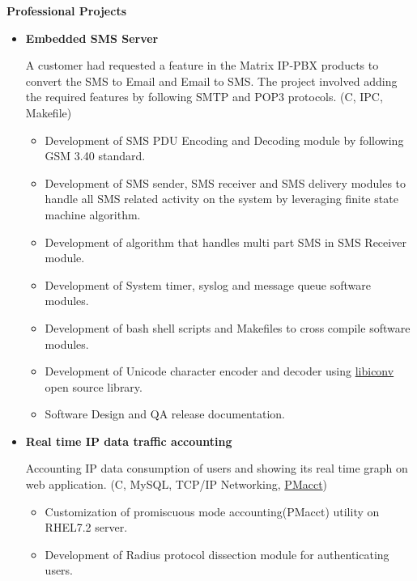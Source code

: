 \documentclass[letterpaper,10pt]{article}
\newcommand{\resitem}[1]{\item #1 \vspace{-2pt}}
\newcommand{\resheading}[1]{{\large \colorbox{mygrey}{\begin{minipage}{\textwidth}{\textbf{#1 \vphantom{p\^{E}}}}\end{minipage}}}}
\begin{document}
\resheading{Professional Projects}
\begin{itemize}

\item
    \textbf{Embedded SMS Server}
    
    A customer had requested a feature in the Matrix IP-PBX products to convert the SMS to Email and Email to SMS. The project involved adding the required features by following SMTP and POP3 protocols. (C, IPC, Makefile)

	\begin{itemize}
		\resitem{Development of SMS PDU Encoding and Decoding module by following GSM 3.40 standard.}
		
		\resitem{Development of SMS sender, SMS receiver and SMS delivery modules to handle all SMS related activity on the system by leveraging finite state machine algorithm.}
	    
	    \resitem{Development of algorithm that handles multi part SMS in SMS Receiver module.}
	    
	    \resitem{Development of System timer, syslog and message queue software modules.}
	    
	    \resitem{Development of bash shell scripts and Makefiles to cross compile software modules.}
        
        \resitem{Development of Unicode character encoder and decoder using \href{https://github.com/bnoordhuis/libiconv}{libiconv} open source library.}
        
        \resitem{Software Design and QA release documentation.}
		
	\end{itemize}
	
\item
    \textbf{Real time IP data traffic accounting}
    
    Accounting IP data consumption of users and showing its real time graph on web application. (C, MySQL, TCP/IP Networking, \href{https://github.com/mehul-m-prajapati/pmacct}{PMacct})
    
	\begin{itemize}
	    \resitem{Customization of promiscuous mode accounting(PMacct) utility on RHEL7.2 server.}
	
	    \resitem{Development of Radius protocol dissection module for authenticating users.}
		

\end{itemize}
\end{itemize}
\end{document}

